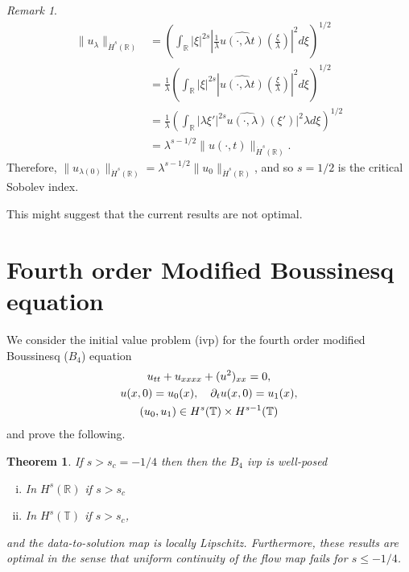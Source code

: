 \documentclass[12pt,reqno]{amsart}
\numberwithin{equation}{section}  %
\numberwithin{figure}{section}
\newcommand{\rr}{\mathbb{R}}
\newcommand{\ci}{\mathbb{T}}
\newcommand{\wh}{\widehat}
\newcommand{\p}{\partial}
\theoremstyle{plain}
\newtheorem{theorem}{Theorem}
\theoremstyle{definition}
\theoremstyle{remark}
\newtheorem{remark}{Remark}
\begin{document}
\begin{itemize}
\begin{framed}
\begin{remark}
\begin{equation*}
\begin{split}
  \| u_{\lambda} \|_{\dot{H}^s(\rr)} 
  & = \left( \int_{\rr} | \xi |^{2s} |
  \frac{1}{\lambda}\wh{u(\cdot, \lambda t)}(\frac{\xi}{\lambda}) |^2 d \xi
  \right)^{1/2}
  \\
  & = \frac{1}{\lambda} \left( \int_{\rr}| \xi |^{2s} | \wh{u(\cdot,
  \lambda t)}(\frac{\xi}{\lambda}) |^2 d \xi  \right)^{1/2}
  \\
  & = \frac{1}{\lambda} \left( \int_{\rr} | \lambda \xi' |^{2s} 
  \wh{u(\cdot, \lambda)}(\xi') |^2 \lambda d \xi
  \right)^{1/2}
  \\
  & = \lambda^{s - 1/2} \|u(\cdot, t) \|_{\dot{H}^s (\rr)}.
\end{split}
\end{equation*}
%
%
Therefore, $\| u_{\lambda(0)} \|_{\dot{H}^s(\rr)} = \lambda^{s - 1/2} \|
u_{0} \|_{\dot{H}^{s}(\rr)}$, and so $s=1/2$ is the critical Sobolev index.
\end{remark}
\end{framed}


\end{itemize}

This might suggest that the current results are not optimal.


%

%
%
%
%
%


%
\section{Fourth order Modified Boussinesq  equation}
%
We consider the initial value problem (ivp) for the fourth order modified Boussinesq
($B_4$) equation 
\begin{gather}
  u_{tt}   + u_{xxxx} + (u^2)_{xx} = 0,
  \label{eqn:mb-2}
  \\
  u(x,0) = u_{0}(x), \quad \p_t u(x, 0) = u_1(x), 
  \label{eqn:mb-init-data-2}
  \\
  \notag
  (u_0, u_1) \in
  H^{s}(\ci) \times
  H^{s-1}(\ci)  
\end{gather}
and prove the following.
%
%
%
%
%
%
%
%
\begin{theorem}
  If $s>s_c = -1/4$ then 
  then the $B_{4}$ ivp is well-posed
  \begin{enumerate}[(i)]
    \item In $H^s(\rr)$ if $s > s_c$
    \item In $H^{s}(\ci)$ if $s > s_c$,
  \end{enumerate}
  and the data-to-solution map is locally Lipschitz. Furthermore, these results
  are optimal in the sense that uniform continuity of the flow map fails for $s
  \le -1/4$. 
  \label{thm:wp-2}
\end{theorem}
%
\end{document}
